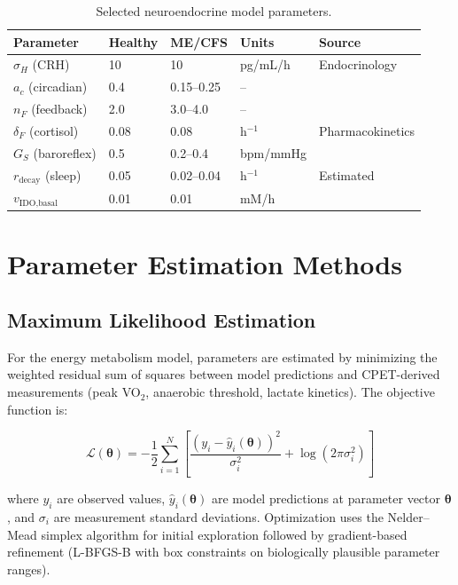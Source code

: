 \begin{table}[htbp]
\centering
\caption{Selected neuroendocrine model parameters.}
\label{tab:neuro-params}
\small
\begin{tabular}{llllp{3.5cm}}
\hline
\textbf{Parameter} & \textbf{Healthy} & \textbf{ME/CFS} & \textbf{Units} & \textbf{Source} \\
\hline
$\sigma_H$ (CRH) & 10 & 10 & pg/mL/h & Endocrinology \\
$a_c$ (circadian) & 0.4 & 0.15--0.25 & -- & \cite{cambras2018circadian} \\
$n_F$ (feedback) & 2.0 & 3.0--4.0 & -- & \cite{Cleare1999} \\
$\delta_F$ (cortisol) & 0.08 & 0.08 & h$^{-1}$ & Pharmacokinetics \\
$G_S$ (baroreflex) & 0.5 & 0.2--0.4 & bpm/mmHg & \cite{Newton2007} \\
$r_{\text{decay}}$ (sleep) & 0.05 & 0.02--0.04 & h$^{-1}$ & Estimated \\
$v_{\text{IDO,basal}}$ & 0.01 & 0.01 & mM/h & \cite{Kavyani2022kynurenine} \\
\hline
\end{tabular}
\end{table}

\section{Parameter Estimation Methods}
\label{sec:parameter-estimation}

\subsection{Maximum Likelihood Estimation}

For the energy metabolism model, parameters are estimated by minimizing the weighted residual sum of squares between model predictions and CPET-derived measurements (peak VO$_2$, anaerobic threshold, lactate kinetics). The objective function is:

\begin{equation}
\label{eq:app-mle}
\mathcal{L}(\boldsymbol{\theta}) = -\frac{1}{2} \sum_{i=1}^{N} \left[ \frac{(y_i - \hat{y}_i(\boldsymbol{\theta}))^2}{\sigma_i^2} + \log(2\pi\sigma_i^2) \right]
\end{equation}

where $y_i$ are observed values, $\hat{y}_i(\boldsymbol{\theta})$ are model predictions at parameter vector $\boldsymbol{\theta}$, and $\sigma_i$ are measurement standard deviations. Optimization uses the Nelder--Mead simplex algorithm for initial exploration followed by gradient-based refinement (L-BFGS-B with box constraints on biologically plausible parameter ranges).

